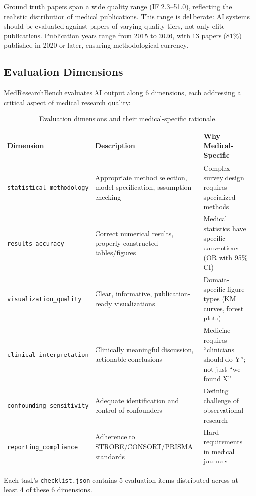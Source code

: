 \documentclass[12pt]{article}
\begin{document}
Ground truth papers span a wide quality range (IF 2.3--51.0), reflecting the realistic distribution of medical publications. This range is deliberate: AI systems should be evaluated against papers of varying quality tiers, not only elite publications. Publication years range from 2015 to 2026, with 13 papers (81\%) published in 2020 or later, ensuring methodological currency.

\subsection{Evaluation Dimensions}

MedResearchBench evaluates AI output along 6 dimensions, each addressing a critical aspect of medical research quality:

\begin{table}[ht]
\centering
\caption{Evaluation dimensions and their medical-specific rationale.}
\begin{tabularx}{\textwidth}{@{}lXX@{}}
\toprule
\textbf{Dimension} & \textbf{Description} & \textbf{Why Medical-Specific} \\
\midrule
\texttt{statistical\_methodology} & Appropriate method selection, model specification, assumption checking & Complex survey design requires specialized methods \\
\texttt{results\_accuracy} & Correct numerical results, properly constructed tables/figures & Medical statistics have specific conventions (OR with 95\% CI) \\
\texttt{visualization\_quality} & Clear, informative, publication-ready visualizations & Domain-specific figure types (KM curves, forest plots) \\
\texttt{clinical\_interpretation} & Clinically meaningful discussion, actionable conclusions & Medicine requires ``clinicians should do Y''; not just ``we found X'' \\
\texttt{confounding\_sensitivity} & Adequate identification and control of confounders & Defining challenge of observational research \\
\texttt{reporting\_compliance} & Adherence to STROBE/CONSORT/PRISMA standards & Hard requirements in medical journals \\
\bottomrule
\end{tabularx}
\end{table}

Each task's \texttt{checklist.json} contains 5 evaluation items distributed across at least 4 of these 6 dimensions.
\end{document}
